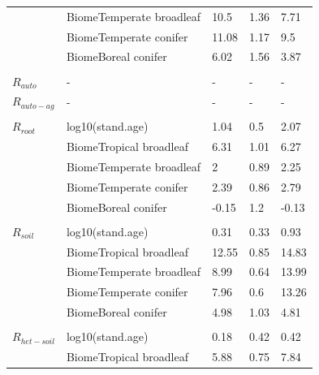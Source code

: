 \documentclass[
]{article}
\begin{document}
\begin{longtable}{lllll}
\hspace{1em} & BiomeTemperate broadleaf & 10.5 & 1.36 & 7.71\\
\hspace{1em} & BiomeTemperate conifer & 11.08 & 1.17 & 9.5\\
\hspace{1em} & BiomeBoreal conifer & 6.02 & 1.56 & 3.87\\
\addlinespace[1em]
\multicolumn{4}{l}{\textbf{}}\\
\hspace{1em}$R_{auto}$ & - & - & - & -\\
\hspace{1em}$R_{auto-ag}$ & - & - & - & -\\
\addlinespace[1em]
\multicolumn{4}{l}{\textbf{}}\\
\hspace{1em}$R_{root}$ & log10(stand.age) & 1.04 & 0.5 & 2.07\\
\hspace{1em} & BiomeTropical broadleaf & 6.31 & 1.01 & 6.27\\
\hspace{1em} & BiomeTemperate broadleaf & 2 & 0.89 & 2.25\\
\hspace{1em} & BiomeTemperate conifer & 2.39 & 0.86 & 2.79\\
\hspace{1em} & BiomeBoreal conifer & -0.15 & 1.2 & -0.13\\
\addlinespace[1em]
\multicolumn{4}{l}{\textbf{}}\\
\hspace{1em}$R_{soil}$ & log10(stand.age) & 0.31 & 0.33 & 0.93\\
\hspace{1em} & BiomeTropical broadleaf & 12.55 & 0.85 & 14.83\\
\hspace{1em} & BiomeTemperate broadleaf & 8.99 & 0.64 & 13.99\\
\hspace{1em} & BiomeTemperate conifer & 7.96 & 0.6 & 13.26\\
\hspace{1em} & BiomeBoreal conifer & 4.98 & 1.03 & 4.81\\
\addlinespace[1em]
\multicolumn{4}{l}{\textbf{}}\\
\hspace{1em}$R_{het-soil}$ & log10(stand.age) & 0.18 & 0.42 & 0.42\\
\hspace{1em} & BiomeTropical broadleaf & 5.88 & 0.75 & 7.84\\

\end{longtable}
\end{document}
